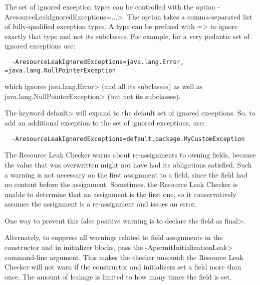 The set of ignored exception types can be controlled with the option
\<-AresourceLeakIgnoredExceptions=...>.  The option takes a comma-separated list of
fully-qualified exception types.  A type can be prefixed with \<=> to ignore exactly
that type and not its subclasses.  For example, for a very pedantic set of ignored
exceptions use:

\begin{verbatim}
  -AresourceLeakIgnoredExceptions=java.lang.Error, =java.lang.NullPointerException
\end{verbatim}

which ignores \<java.lang.Error> (and all its subclasses) as well as
\<java.lang.NullPointerException> (but not its subclasses).

The keyword \<default> will expand to the default set of ignored exceptions.  So,
to add an additional exception to the set of ignored exceptions, use:

\begin{verbatim}
  -AresourceLeakIgnoredExceptions=default,package.MyCustomException
\end{verbatim}



The Resource Leak Checker warns about re-assignments to owning fields,
because the value that was overwritten might not have had its obligations
satisfied.  Such a warning is not necessary on the first assignment to a
field, since the field had no content before the assignment.  Sometimes,
the Resource Leak Checker is unable to determine that an assignment is the
first one, so it conservatively assumes the assignment is a re-assignment
and issues an error.

One way to prevent this false positive warning is to declare the field as \<final>.

Alternately, to suppress all warnings related to field assignments in the
constructor and in initializer blocks, pass the
\<-ApermitInitializationLeak> command-line argument.  This makes the
checker unsound:  the Resource Leak Checker will not warn if the constructor
and initializers set a field more than once.  The amount of leakage is
limited to how many times the field is set.


